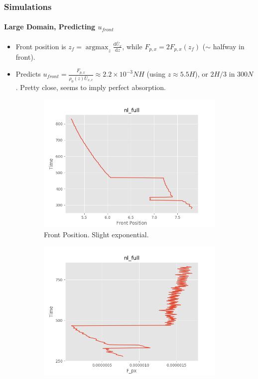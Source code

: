 \documentclass[dvipsnames, 10pt]{beamer}
\newcommand*{\scinot}[2]{#1\times10^{#2}}
\newcommand*{\rd}[2]{\frac{\mathrm{d}#1}{\mathrm{d}#2}}
\DeclareMathOperator*{\argmax}{argmax}
\begin{document}
\begin{frame}
    \frametitle{Simulations}
    \framesubtitle{Large Domain, Predicting $u_{front}$}

    \begin{itemize}
        \item Front position is $z_f = \argmax_z \rd{\bar{U}_x}{z}$, while
            $F_{p, x} = 2F_{p, x}(z_f)$ ($\sim$ halfway in front).

        \item Predicts $u_{front} = \frac{F_{p, x}}{\rho_0(z) \bar{U}_{x, c}}
            \approx \scinot{2.2}{-3}NH$ (using $z \approx 5.5H$), or $2H/3$ in
            $300N$. Pretty close, seems to imply perfect absorption.
    \end{itemize}
    \begin{figure}[t]
        \centering
        \hspace*{-19mm}%
        \begin{subfigure}{0.53\textwidth}
            \centering
            \includegraphics[width=\textwidth]{front_nl_full.png}
            \caption{Front Position. Slight exponential.}
        \end{subfigure}
        \begin{subfigure}{0.53\textwidth}
            \centering
            \includegraphics[width=\textwidth]{fluxes_nl_full.png}

\end{subfigure}
\end{figure}
\end{frame}
\end{document}
